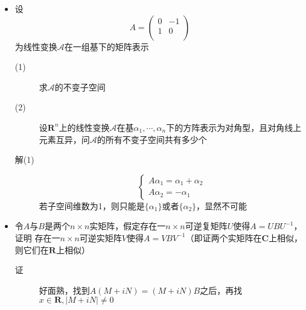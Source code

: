 \begin{itemize}
\item 设
\[
A=\left(
\begin{array}{cc}
0 & -1 \\
1 & 0\\
\end{array}
\right)
\]
为线性变换$\mathcal{A}$在一组基下的矩阵表示
\begin{description}
\item[(1)] 求$\mathcal{A}$的不变子空间
\item[(2)] 设$\mathbf{R}^n$上的线性变换$\mathcal{A}$在基$\alpha_1,\cdots,\alpha_n$下的方阵表示为对角型，且对角线上元素互异，问$\mathcal{A}$的所有不变子空间共有多少个
\item[解(1)]
\[
\begin{cases}
A\alpha_1 = \alpha_1 +\alpha_2\\
A\alpha_2 = -\alpha_1
\end{cases}
\]
若子空间维数为1，则只能是$\{\alpha_1\}$或者$\{\alpha_2\}$，显然不可能
\end{description}


\item 令$A$与$B$是两个$n \times n$实矩阵，假定存在一$n \times n$可逆复矩阵$U$使得$A=UBU^{-1}$，证明
存在一$n \times n$可逆实矩阵$V$使得$A=VBV^{-1}$（即证两个实矩阵在$\mathbf{C}$上相似，则它们在$\mathbf{R}$上相似）
\begin{description}
\item[证] 好面熟，找到$A(M+iN)=(M+iN)B$之后，再找$x\in \mathbf{R},|M+iN|\neq 0$
\end{description}


\end{itemize}
